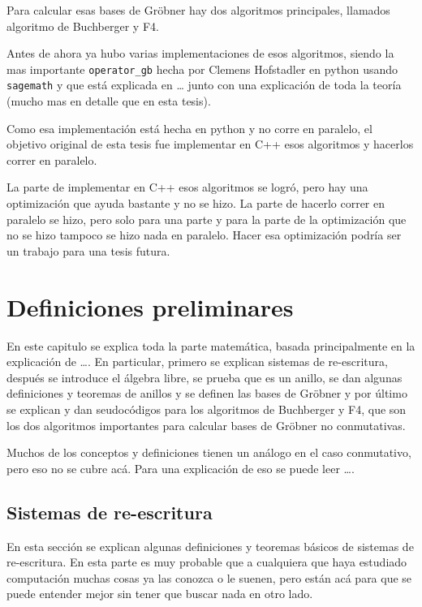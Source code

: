 \documentclass{report}
\theoremstyle{customstyle}
\theoremstyle{factstyle}
\begin{document}
Para calcular esas bases de Gröbner hay dos algoritmos principales, llamados algoritmo de Buchberger y F4.

Antes de ahora ya hubo varias implementaciones de esos algoritmos, siendo la mas importante \texttt{operator\_gb} hecha por Clemens Hofstadler en python usando \texttt{sagemath} y que está explicada en … %
junto con una explicación de toda la teoría (mucho mas en detalle que en esta tesis).

Como esa implementación está hecha en python y no corre en paralelo, el objetivo original de esta tesis fue implementar en C++ esos algoritmos y hacerlos correr en paralelo.

La parte de implementar en C++ esos algoritmos se logró, pero hay una optimización que ayuda bastante y no se hizo. La parte de hacerlo correr en paralelo se hizo, pero solo para una parte y para la parte de la optimización que no se hizo tampoco se hizo nada en paralelo. Hacer esa optimización podría ser un trabajo para una tesis futura.

\chapter{Definiciones preliminares}\label{cap:Definiciones preliminares}

En este capitulo se explica toda la parte matemática, basada principalmente en la explicación de …. %
En particular, primero se explican sistemas de re-escritura, después se introduce el álgebra libre, se prueba que es un anillo, se dan algunas definiciones y teoremas de anillos y se definen las bases de Gröbner y por último se explican y dan seudocódigos para los algoritmos de Buchberger y F4, que son los dos algoritmos importantes para calcular bases de Gröbner no conmutativas.

Muchos de los conceptos y definiciones tienen un análogo en el caso conmutativo, pero eso no se cubre acá. Para una explicación de eso se puede leer …. %

\section{Sistemas de re-escritura}

En esta sección se explican algunas definiciones y teoremas básicos de sistemas de re-escritura. En esta parte es muy probable que a cualquiera que haya estudiado computación muchas cosas ya las conozca o le suenen, pero están acá para que se puede entender mejor sin tener que buscar nada en otro lado.
\end{document}
